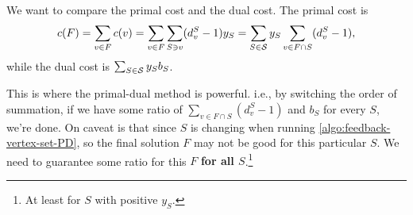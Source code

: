 We want to compare the primal cost and the dual cost. The primal cost is
\[
	c(F) = \sum_{v\in F}c(v) = \sum_{v\in F}\sum_{S\ni v} (d_{v} ^S - 1) y_S = \sum_{S\in \mathcal{\MakeUppercase{S}}}y_S \sum_{v\in F \cap S}(d_{v} ^S - 1),
\]
while the dual cost is \(\sum_{S\in \mathcal{\MakeUppercase{S}} }y_S b_S\).

\begin{remark}
	This is where the primal-dual method is powerful. i.e., by switching the order of summation, if we have some ratio of \(\sum_{v\in F \cap S}(d_{v} ^S - 1)\) and \(b_S\) for every \(S\), we're done. On caveat is that since \(S\) is changing when running \autoref{algo:feedback-vertex-set-PD}, so the final solution \(F\) may not be good for this particular \(S\). We need to guarantee some ratio for this \(F\) \textbf{for all \(S\)}.\footnote{At least for \(S\) with positive \(y_S\).}
\end{remark}

